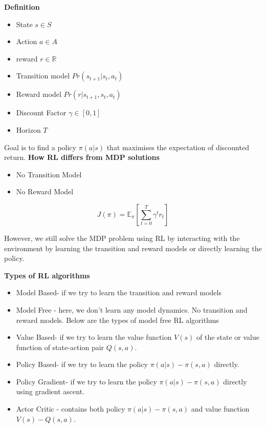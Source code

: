 \documentclass[../main.tex]{subfiles}
\begin{document}
\textbf{Definition}
\begin{itemize}
    \item State $s \in S$
    \item Action $a \in A$
    \item reward $r \in \mathbb{R} $
    \item Transition model $Pr(s_{t+1} | s_t, a_t)$
    \item Reward model $Pr(r |  s_{t+1}, s_t, a_t)$
    \item Discount Factor $\gamma \in [0,1]$
    \item Horizon $T$
\end{itemize}
Goal is to find a policy $\pi(a|s)$ that maximises the expectation of discounted return.
\newline
\textbf{How RL differs from MDP solutions}
\begin{itemize}
    \item No Transition Model
    \item No Reward Model
\end{itemize}
$$ J(\pi) = \mathbb{E}_\pi \left[ \sum\limits_{t=0}^T \gamma^t r_t \right]$$

However, we still solve the MDP problem using RL by interacting with the environment by learning the transition and reward models or directly learning the policy.

\textbf{Types of RL algorithms}
\begin{itemize}
    \item Model Based- if we try to learn the transition and reward models
    \item Model Free - here, we don't learn any model dynamics. No transition and reward models. Below are the types of model free RL algorithms
    \item Value Based- if we try to learn the value function $V(s)$ of the state or value function of state-action pair $Q(s,a)$.
    \item Policy Based- if we try to learn the policy $\pi(a|s) -  \pi(s,a)$ directly.
    \item Policy Gradient- if we try to learn the policy $\pi(a|s) - \pi(s,a)$ directly using gradient ascent.
    \item Actor Critic - contains both policy $\pi(a|s) - \pi(s,a)$ and value function $V(s) -  Q(s,a)$.
\end{itemize}
\end{document}
